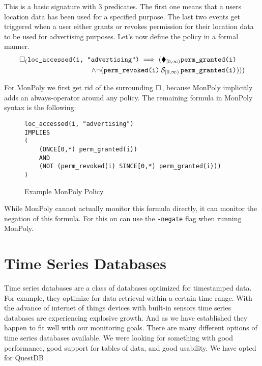 This is a basic signature with 3 predicates.
The first one means that a users location data has been used for a specified purpose.
The last two events get triggered when a user either grants or revokes permission for their location data to be used for advertising purposes.
Let's now define the policy in a formal manner.
\begin{align*}
    \square_{(}\texttt{loc\_accessed(i, "advertising")}
    \implies (\blacklozenge_{[0,\infty)} &\texttt{perm\_granted(i)} \\
         \land  \neg (\texttt{perm\_revoked(i)} \,\mathcal{S}_{[0,\infty)}\, 
            &\texttt{perm\_granted(i)})))
\end{align*}

For MonPoly we first get rid of the surrounding $\square_{}$, because MonPoly implicitly adds an always-operator around any policy.
The remaining formula in MonPoly syntax is the following:

\begin{figure}[H]
    \label{fig:example-policy}
\begin{verbatim}
loc_accessed(i, "advertising")
IMPLIES 
(
    (ONCE[0,*) perm_granted(i)) 
    AND 
    (NOT (perm_revoked(i) SINCE[0,*) perm_granted(i)))
)
\end{verbatim}
    \caption{Example MonPoly Policy}
\end{figure}

While MonPoly cannot actually monitor this formula directly, it can monitor the negation of this formula.
For this on can use the \texttt{-negate} flag when running MonPoly.

\section{Time Series Databases}

Time series databases are a class of databases optimized for timestamped data.
For example, they optimize for data retrieval within a certain time range.
With the advance of internet of things devices with built-in sensors time series databases are experiencing explosive growth.
And as we have established they happen to fit well with our monitoring goals.
There are many different options of time series databases available.
We were looking for something with good performance, good support for tables of data, and good usability.
We have opted for QuestDB \cite{questdb}.


